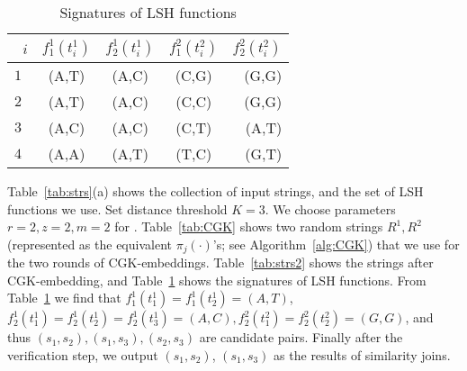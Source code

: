 \begin{table}[!]
\centering
\begin{tabular}{l*{3}{c}r}
\ $i$              &$f_1^1(t_i^1)$  &$f_2^1(t_i^1)$ & $f_1^2(t_i^2)$ & $f_2^2(t_i^2)$   \\
\hline
$1$    & (A,T) & (A,C) & (C,G) & (G,G) \\
$2$     & (A,T) & (A,C) & (C,C) & (G,G)  \\
$3$    & (A,C) & (A,C) & (C,T) & (A,T) \\
$4$     & (A,A) & (A,T) & (T,C) & (G,T)  \\
\end{tabular}
\caption{Signatures of LSH functions}  
\label{tab:lshvalue}
\end{table}

Table~\ref{tab:strs}(a) shows the collection of input strings, and the set of LSH functions we use. Set distance threshold $K=3$. We choose parameters $r=2, z=2, m=2$ for \ebdjoin.  
Table~\ref{tab:CGK} shows two random strings $R^1, R^2$ (represented as the equivalent $\pi_j(\cdot)$'s; see Algorithm~\ref{alg:CGK}) that we use for the two rounds of CGK-embeddings. Table~\ref{tab:strs2} shows the strings after CGK-embedding, and Table~\ref{tab:lshvalue} shows the signatures of LSH functions. From Table~\ref{tab:lshvalue} we find that $f_1^1(t_1^1)=f_1^1(t_2^1)=(A,T)$, $f_2^1(t_1^1)=f_2^1(t_2^1)=f_2^1(t_3^1)=(A,C), f_2^2(t_1^2)=f_2^2(t_2^2)=(G,G)$, and thus $ (s_1,s_2),(s_1,s_3),(s_2,s_3)$ are candidate pairs.  Finally after the verification step, we output $(s_1,s_2)$, $(s_1,s_3)$ as the results of similarity joins. 
